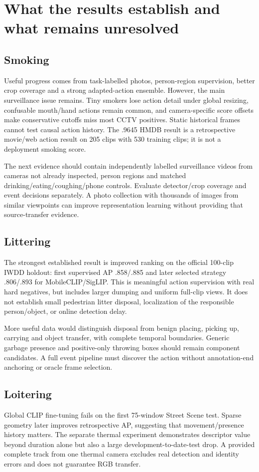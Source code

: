 \chapter{What the results establish and what remains unresolved}
\label{ch:interpretation}
\section{Smoking}
Useful progress comes from task-labelled photos, person-region supervision, better crop coverage and a strong adapted-action ensemble. However, the main surveillance issue remains. Tiny smokers lose action detail under global resizing, confusable mouth/hand actions remain common, and camera-specific score offsets make conservative cutoffs miss most CCTV positives. Static historical frames cannot test causal action history. The .9645 HMDB result is a retrospective movie/web action result on 205 clips with 530 training clips; it is not a deployment smoking score.

The next evidence should contain independently labelled surveillance videos from cameras not already inspected, person regions and matched drinking/eating/coughing/phone controls. Evaluate detector/crop coverage and event decisions separately. A photo collection with thousands of images from similar viewpoints can improve representation learning without providing that source-transfer evidence.

\section{Littering}
The strongest established result is improved ranking on the official 100-clip IWDD holdout: first supervised AP .858/.885 and later selected strategy .806/.893 for MobileCLIP/SigLIP. This is meaningful action supervision with real hard negatives, but includes larger dumping and uniform full-clip views. It does not establish small pedestrian litter disposal, localization of the responsible person/object, or online detection delay.

More useful data would distinguish disposal from benign placing, picking up, carrying and object transfer, with complete temporal boundaries. Generic garbage presence and positive-only throwing boxes should remain component candidates. A full event pipeline must discover the action without annotation-end anchoring or oracle frame selection.

\section{Loitering}
Global CLIP fine-tuning fails on the first 75-window Street Scene test. Sparse geometry later improves retrospective AP, suggesting that movement/presence history matters. The separate thermal experiment demonstrates descriptor value beyond duration alone but also a large development-to-date-test drop. A provided complete track from one thermal camera excludes real detection and identity errors and does not guarantee RGB transfer.

